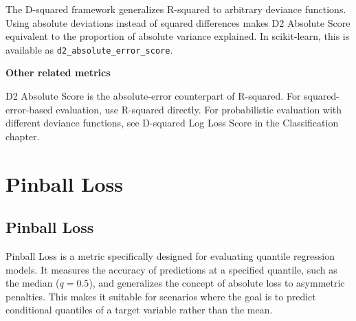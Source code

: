 {The D-squared framework generalizes R-squared to arbitrary deviance functions. Using absolute deviations instead of squared differences makes D2 Absolute Score equivalent
to the proportion of absolute variance explained. In scikit-learn, this is available as \texttt{d2\_absolute\_error\_score}.}

\textbf{Other related metrics}

D2 Absolute Score is the absolute-error counterpart of R-squared. For squared-error-based evaluation, use R-squared directly.
For probabilistic evaluation with different deviance functions, see D-squared Log Loss Score in the Classification chapter.

\clearpage
\thispagestyle{regressionstyle}
\section{Pinball Loss}
\subsection{Pinball Loss }

Pinball Loss is a metric specifically designed for evaluating quantile regression models. It measures the accuracy of predictions at a specified quantile, such as the median ($q=0.5$),
and generalizes the concept of absolute loss to asymmetric penalties. This makes it suitable for scenarios where the goal is to predict conditional quantiles of a target variable
rather than the mean.

\begin{center}
\end{center}

